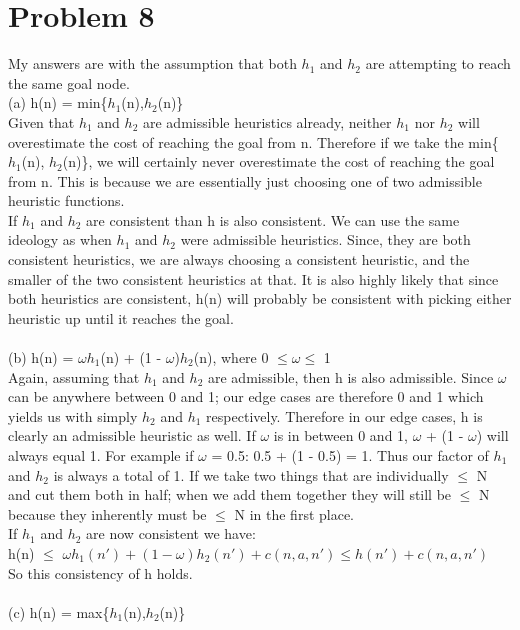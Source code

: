 \documentclass[12pt]{article}
\begin{document}
\section *{Problem 8}
My answers are with the assumption that both $h_1$ and $h_2$ are attempting to reach the same goal node. \\
(a) h(n) = min\{$h_1$(n),$h_2$(n)\} \\
Given that $h_1$ and $h_2$ are admissible heuristics already, neither $h_1$ nor $h_2$ will overestimate the cost of reaching the goal from n. Therefore if we take the min\{$h_1$(n), $h_2$(n)\}, we will certainly never overestimate the cost of reaching the goal from n. This is because we are essentially just choosing one of two admissible heuristic functions. \\
If $h_1$ and $h_2$ are consistent  than h is also consistent. We can use the same ideology as when $h_1$ and $h_2$ were admissible heuristics. Since, they are both consistent heuristics, we are always choosing a consistent heuristic, and the smaller of the two consistent heuristics at that. It is also highly likely that since both heuristics are consistent, h(n) will probably be consistent with picking either heuristic up until it reaches the goal.\\ \\
(b) h(n) = $\omega h_1$(n) + (1 - $\omega$)$h_2$(n), where 0 $\leq \omega \leq$ 1 \\
Again, assuming that $h_1$ and $h_2$ are admissible, then h is also admissible. Since $\omega$ can be anywhere between 0 and 1; our edge cases are therefore 0 and 1 which yields us with simply $h_2$ and $h_1$ respectively. Therefore in our edge cases, h is clearly an admissible heuristic as well. If $\omega$ is in between 0 and 1, $\omega$ + (1 - $\omega$) will always equal 1. For example if $\omega$ = 0.5: 0.5 + (1 - 0.5) = 1. Thus our factor of $h_1$ and $h_2$ is always a total of 1. If we take two things that are individually $\leq$ N and cut them both in half; when we add them together they will still be $\leq$ N because they inherently must be $\leq$ N in the first place. \\
If $h_1$ and $h_2$ are now consistent we have:\\ h(n) $\leq$ $\omega h_1(n') + (1-\omega)h_2(n')+c(n, a, n') \leq h(n') + c(n, a, n')$\\
So this consistency of h holds. \\ \\
(c) h(n) = max\{$h_1$(n),$h_2$(n)\} \\
\end{document}
